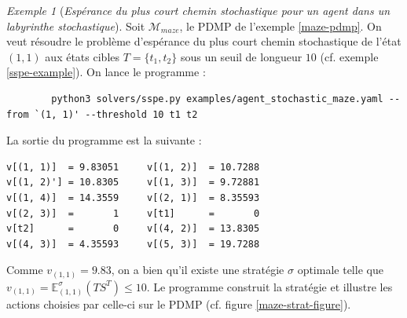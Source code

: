 \documentclass[12pt,a4paper]{report}
\theoremstyle{definition}%
\theoremstyle{remark}
\newtheorem{example}{Exemple}[chapter]
\begin{document}
\begin{example}[\textit{Espérance du plus court chemin stochastique pour un agent dans un labyrinthe stochastique}]
Soit $\mathcal{M}_{\textit{maze}}$, le PDMP de l'exemple \ref{maze-pdmp}.
On veut résoudre le problème d'espérance du plus court chemin stochastique
de l'état $(1, 1)$ aux états cibles $T = \{ t_1, t_2 \}$ sous un seuil de longueur
$10$ (cf. exemple \ref{sspe-example}). On lance le programme :

\scriptsize
\begin{verbatim}
		python3 solvers/sspe.py examples/agent_stochastic_maze.yaml --from `(1, 1)' --threshold 10 t1 t2
\end{verbatim}
\normalsize

La sortie du programme est la suivante :

\scriptsize
\begin{verbatim}
v[(1, 1)]  = 9.83051 	 v[(1, 2)]  = 10.7288
v[(1, 2)'] = 10.8305 	 v[(1, 3)]  = 9.72881
v[(1, 4)]  = 14.3559 	 v[(2, 1)]  = 8.35593
v[(2, 3)]  =       1 	 v[t1]      =       0
v[t2]      =       0 	 v[(4, 2)]  = 13.8305
v[(4, 3)]  = 4.35593 	 v[(5, 3)]  = 19.7288
\end{verbatim}

\normalsize

Comme $v_{(1, 1)} = 9.83$, on a bien qu'il existe une stratégie
$\sigma$ optimale telle que $v_{(1, 1)} = \mathbb{E}^\sigma_{(1,
1)}(TS^T) \leq 10$. Le programme construit la stratégie et illustre les actions
choisies par celle-ci sur le PDMP (cf. figure \ref{maze-strat-figure}).

\end{example}
\end{document}
